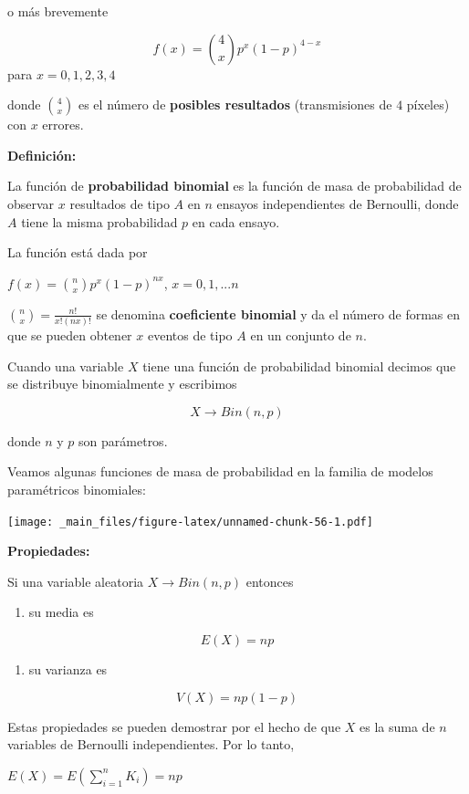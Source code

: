 \documentclass[
]{book}
\providecommand{\tightlist}{%
  \setlength{\itemsep}{0pt}\setlength{\parskip}{0pt}}
\begin{document}
o más brevemente

\[f(x)=\binom 4 xp^x(1-p)^{4-x}\]
para \(x=0,1,2,3,4\)

donde \(\binom 4 x\) es el número de \textbf{posibles resultados} (transmisiones de \(4\) píxeles) con \(x\) errores.

\textbf{Definición:}

La función de \textbf{probabilidad binomial} es la función de masa de probabilidad de observar \(x\) resultados de tipo \(A\) en \(n\) ensayos independientes de Bernoulli, donde \(A\) tiene la misma probabilidad \(p\) en cada ensayo.

La función está dada por

\(f(x)=\binom nxp^x(1-p)^{nx}\), \(x=0,1,...n\)

\(\binom nx= \frac{n!}{x!(nx)!}\) se denomina \textbf{coeficiente binomial} y da el número de formas en que se pueden obtener \(x\) eventos de tipo \(A\) en un conjunto de \(n\).

Cuando una variable \(X\) tiene una función de probabilidad binomial decimos que se distribuye binomialmente y escribimos

\[X\rightarrow Bin(n,p)\]

donde \(n\) y \(p\) son parámetros.

Veamos algunas funciones de masa de probabilidad en la familia de modelos paramétricos binomiales:

\texttt{[image: \_main\_files/figure-latex/unnamed-chunk-56-1.pdf]}

\textbf{Propiedades:}

Si una variable aleatoria \(X\rightarrow Bin(n,p)\) entonces

\begin{enumerate}
\def\labelenumi{\arabic{enumi})}
\tightlist
\item
  su media es
\end{enumerate}

\[E(X)=np\]

\begin{enumerate}
\def\labelenumi{\arabic{enumi})}
\setcounter{enumi}{1}
\tightlist
\item
  su varianza es
\end{enumerate}

\[V(X)=np(1-p)\]

Estas propiedades se pueden demostrar por el hecho de que \(X\) es la suma de \(n\) variables de Bernoulli independientes. Por lo tanto,

\(E(X)=E(\sum_{i=1}^n K_i)=np\)
\end{document}
